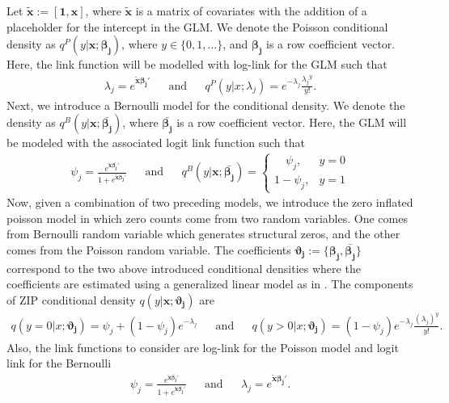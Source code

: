 \documentclass[11pt,letterpaper]{article}
\numberwithin{equation}{section}
\numberwithin{equation}{section}
\numberwithin{equation}{section}
\begin{document}
\newcommand{\xTilda}{\bm{\tilde{x}}}
Let $ \xTilda := [\bm{1},\bm{x}]$, where $\xTilda $ is a matrix of covariates with the addition of a placeholder for the intercept in the GLM. We denote the Poisson conditional density  as $ q^P(y|\bm{x}; \bm{\beta_j}) $, where $y \in \{0,1,\dots\}$, and  $\bm{\beta_j}$ is a row coefficient vector.
Here, the link function will be modelled with log-link for the GLM such that
 \begin{align*}
\lambda_j = e^{\xTilda \bm{\beta_j}'} && \text{and} & & %
q^P(y|  x ; \lambda_{j} ) = e^{-\lambda_j} \frac{{\lambda_j}^y}{y!}.
 \end{align*}
Next, we introduce a Bernoulli model for the conditional density. We denote the density as  $ q^{B}(y|\bm{x}; \bm{\bar{\beta_j}}) $, where $\bm{\bar{\beta_j}}$ is a row coefficient vector.  Here, the GLM will be modeled with the associated logit link function such that
 \begin{align*}
 \psi_j =  \frac{e^{\xTilda \bm{\bar{\beta_j}}'}}{1+ e^{\xTilda  \bm{\bar{\beta_j}}'}}  && \text{and} && 
 q^B(y | \bm{x} ; \bm{\bar{\beta_j}}) = \begin{cases}
      \quad \psi_j, & y = 0\\
     1 -  \psi_j,  & y = 1
   \end{cases}
 \end{align*}
 Now, given a combination of two preceding models, we introduce the zero inflated poisson model in which zero counts come from two random variables. One comes from Bernoulli random variable which generates structural zeros, and the other comes from the Poisson random variable. The coefficients $ \bm{\vartheta_{j}} :=  \{ \bm{\beta_{j}},  \bm{\bar{\beta_j}} \} $ correspond to the two above introduced conditional densities where the coefficients are estimated using a generalized linear model as in \cite{Lambert}. The components of ZIP conditional density $q(y|\bm{x}; \bm{\vartheta_{j}}  )$ are %
 \begin{align*}
 q( y = 0| x ; \bm{ \vartheta_{j} } ) = \psi_j + (1 - \psi_j)e^{-\lambda_j}  & &  \text{and}  & &
q(y > 0 |  x ; \bm{ \vartheta_{j} } ) = (1 - \psi_j)e^{-\lambda_j} \frac{\left(\lambda_j \right)^y  }{y!}.
 \end{align*}
Also, the link functions to consider are log-link for the Poisson model and logit link for the Bernoulli
 \begin{align*}
 \psi_j =  \frac{e^{\xTilda \bm{\bar{\beta_j}}'}}{1+ e^{\xTilda \bm{\bar{\beta_j}}'}}  & & \text{and} & &
\lambda_j  = e^{\xTilda \bm{\beta_j}'}.
 \end{align*}
\end{document}
